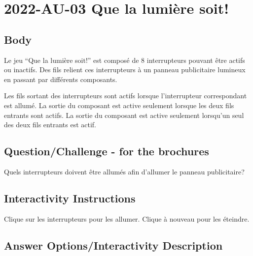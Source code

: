 \documentclass[a4paper,11pt]{report}
\newcommand{\taskGraphicsFolder}{..}
\begin{document}
\section*{\centering{} 2022-AU-03 Que la lumière soit!}


\subsection*{Body}

Le jeu “Que la lumière soit!” est composé de $8$ interrupteurs pouvant être actifs ou inactifs. Des fils relient ces interrupteurs à un panneau publicitaire lumineux en passant par différents composants.

{\centering%
\par}

Les fils sortant des interrupteurs sont actifs lorsque l’interrupteur correspondant est allumé. La sortie du composant \raisebox{\dimexpr -0.5ex -0.6ex \relax}{} est active seulement lorsque les deux fils entrants sont actifs. La sortie du composant \raisebox{\dimexpr -0.5ex -0.6ex \relax}{} est active seulement lorsqu’un seul des deux fils entrants est actif.

{\em


\subsection*{Question/Challenge - for the brochures}

Quels interrupteurs doivent être allumés \raisebox{-0.5ex}{} afin d’allumer le panneau publicitaire?

}


\subsection*{Interactivity Instructions}

Clique sur les interrupteurs pour les allumer. Clique à nouveau pour les éteindre.

\begingroup
\renewcommand{\arraystretch}{1.5}
\subsection*{Answer Options/Interactivity Description}
\end{document}
